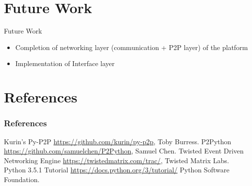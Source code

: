 \documentclass{beamer}
\begin{document}
\section{Future Work}
\begin{frame}{Future Work}
\begin{itemize}
\item Completion of networking layer (communication + P2P layer) of the platform 
\end{itemize}
\begin{itemize}
\item Implementation of Interface layer
\end{itemize}
\end{frame}


\section{References}
\begin{frame}[allowframebreaks]
  \frametitle<presentation>{References}   
\begin{thebibliography}{}

Kurin's Py-P2P \url{https://github.com/kurin/py-p2p}, Toby Burress.
P2Python \url{https://github.com/samuelchen/P2Python}, Samuel Chen.
Twisted Event Driven Networking Engine \url{https://twistedmatrix.com/trac/}, Twisted Matrix Labs.
Python 3.5.1 Tutorial \url{https://docs.python.org/3/tutorial/} Python Software Foundation.
\end{thebibliography}{}

\end{frame}
\end{document}
